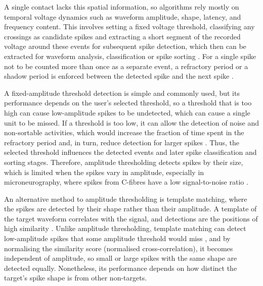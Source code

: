 \documentclass[ %
                    author={Rzan Alkabier},
                    supervisor={Dr. Zahraa Abdallah},
                    degree={MSc},
                     title={Denoising Extracellular Recording for Spike Detection and Classification on Single Channels},
                    subtitle={Does denoising improve detection and classification performance?},
                      type={},
                      year={2026}]{dissertation}
\begin{document}
A single contact lacks this spatial information, so algorithms rely mostly on temporal voltage dynamics such as waveform amplitude, shape, latency, and frequency content. This involves setting a fixed voltage threshold, classifying any crossings as candidate spikes and extracting a short segment of the recorded voltage around these events for subsequent spike detection, which then can be extracted for waveform analysis, classification or spike sorting \cite{laboy-juarez_normalized_2019}. For a single spike not to be counted more than once as a separate event, a refractory period or a shadow period is enforced between the detected spike and the next spike \cite{laboy-juarez_normalized_2019}. 
\bigskip

\noindent
A fixed-amplitude threshold detection is simple and commonly used, but its performance depends on the user's selected threshold, so a threshold that is too high can cause low-amplitude spikes to be undetected, which can cause a single unit to be missed. If a threshold is too low, it can allow the detection of noise and non-sortable activities, which would increase the fraction of time spent in the refractory period and, in turn, reduce detection for larger spikes \cite{laboy-juarez_normalized_2019}. Thus, the selected threshold influences the detected events and later spike classification and sorting stages. Therefore, amplitude thresholding detects spikes by their size, which is limited when the spikes vary in amplitude, especially in microneurography, where spikes from C-fibres have a low signal-to-noise ratio \cite{troglio_hybrid_2026}. 
\bigskip

\noindent
An alternative method to amplitude thresholding is template matching, where the spikes are detected by their shape rather than their amplitude. A template of the target waveform correlates with the signal, and detections are the positions of high similarity \cite{laboy-juarez_normalized_2019}. Unlike amplitude thresholding, template matching can detect low-amplitude spikes that some amplitude threshold would miss \cite{laboy-juarez_normalized_2019}, and by normalising the similarity score (normalised cross-correlation), it becomes independent of amplitude, so small or large spikes with the same shape are detected equally. Nonetheless, its performance depends on how distinct the target's spike shape is from other non-targets. 
\bigskip
\end{document}
